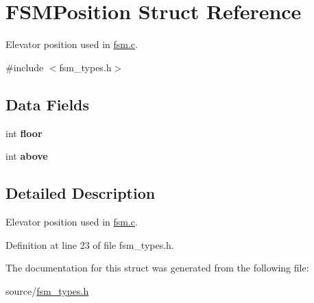 \hypertarget{structFSMPosition}{}\section{F\+S\+M\+Position Struct Reference}
\label{structFSMPosition}


Elevator position used in {\ttfamily \hyperlink{fsm_8c_source}{fsm.\+c}}.  




{\ttfamily \#include $<$fsm\+\_\+types.\+h$>$}

\subsection*{Data Fields}
\begin{DoxyCompactItemize}
\item 
\mbox{\label{structFSMPosition_a40c73f44ee3cb7ca8062f71d2001ecf2}} 
int {\bfseries floor}
\item 
\mbox{\label{structFSMPosition_a7f8cfe43199b380c6621f1f932a7e75a}} 
int {\bfseries above}
\end{DoxyCompactItemize}


\subsection{Detailed Description}
Elevator position used in {\ttfamily \hyperlink{fsm_8c_source}{fsm.\+c}}. 

Definition at line 23 of file fsm\+\_\+types.\+h.



The documentation for this struct was generated from the following file\+:\begin{DoxyCompactItemize}
\item 
source/\hyperlink{fsm__types_8h}{fsm\+\_\+types.\+h}\end{DoxyCompactItemize}
